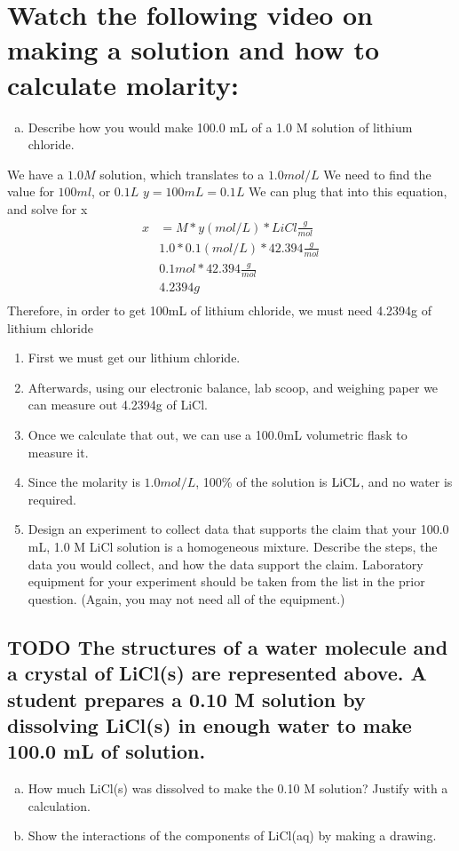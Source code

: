 \documentclass[11pt]{article}
\begin{document}
\section{Watch the following video on making a solution and how to calculate molarity:}
\label{sec:orga34c082}
\begin{enumerate}[(a)]
\item Describe how you would make 100.0 mL of a 1.0 M solution of lithium chloride.
\end{enumerate}
We have a \(1.0M\) solution, which translates to  a \(1.0mol/L\)
We need to find the value for \(100ml\), or \(0.1L\)
\(y = 100mL = 0.1L\)
We can plug that into this equation, and solve for x
\begin{align*}
x&= M * y(mol/L) * LiCl\frac{g}{mol}\\
&1.0 * 0.1(mol/L) * 42.394\frac{g}{mol}\\
&0.1mol * 42.394\frac{g}{mol}\\
&4.2394g\\
\end{align*}
Therefore, in order to get 100mL of lithium chloride, we must need 4.2394g of lithium chloride
\begin{enumerate}
\item First we must get our lithium chloride.
\item Afterwards, using our electronic balance, lab scoop, and weighing paper we can measure out 4.2394g of LiCl.
\item Once we calculate that out, we can use a 100.0mL volumetric flask to measure it.
\item Since the molarity is \(1.0mol/L\), 100\% of the solution is \(\ce{LiCL}\), and no water is required.

\item Design an experiment to collect data that supports the claim that your 100.0
mL, 1.0 M LiCl solution is a homogeneous mixture. Describe the steps, the
data you would collect, and how the data support the claim. Laboratory
equipment for your experiment should be taken from the list in the prior
question. (Again, you may not need all of the equipment.)
\end{enumerate}

\subsection{{\bfseries\sffamily TODO} The structures of a water molecule and a crystal of LiCl(s) are represented above. A student prepares a 0.10 M solution by dissolving LiCl(s) in enough water to make 100.0 mL of solution.}
\label{sec:orgcd903d4}
\begin{enumerate}[(a)]
\item How much LiCl(s) was dissolved to make the 0.10 M solution? Justify with a
calculation.
\item Show the interactions of the components of LiCl(aq) by making a drawing.
\end{enumerate}
\end{document}
